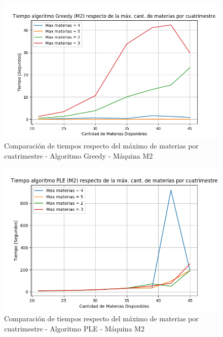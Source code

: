 \documentclass[a4paper]{article}
\begin{document}
\begin{figure}[H]
\centering
\includegraphics[scale=0.65]{Imagenes/m2_GREEDY_max_cantidad_materias_cuatrimestres.png}\par
\caption{Comparación de tiempos respecto del máximo de materias por cuatrimestre - Algoritmo Greedy - Máquina M2}
\end{figure}

\begin{figure}[H]
\centering
\includegraphics[scale=0.65]{Imagenes/m2_PLE_max_cantidad_materias_cuatrimestres.png}\par
\caption{Comparación de tiempos respecto del máximo de materias por cuatrimestre - Algoritmo PLE - Máquina M2}
\end{figure}
\end{document}
